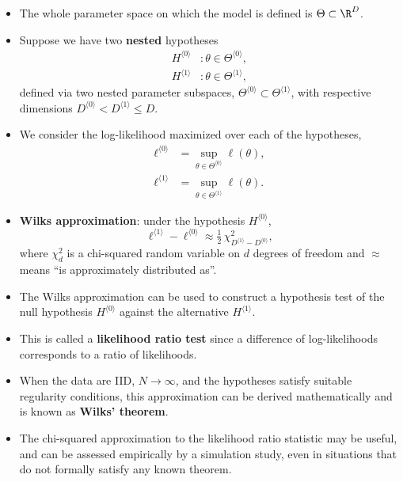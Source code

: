 \documentclass[
  letterpaper,
  DIV=11,
  numbers=noendperiod]{scrartcl}
\providecommand{\tightlist}{%
  \setlength{\itemsep}{0pt}\setlength{\parskip}{0pt}}\usepackage{longtable,booktabs,array}
\begin{document}
\begin{itemize}
\tightlist
\item
  The whole parameter space on which the model is defined is
  \(\Theta\subset\R^D\).
\item
  Suppose we have two \textbf{nested} hypotheses \begin{equation*}
    \begin{aligned}
      H^{\langle 0\rangle} &: \theta\in \Theta^{\langle 0\rangle}, \\
      H^{\langle 1\rangle} &: \theta\in \Theta^{\langle 1\rangle},
    \end{aligned}
  \end{equation*} defined via two nested parameter subspaces,
  \(\Theta^{\langle 0\rangle}\subset \Theta^{\langle 1\rangle}\), with
  respective dimensions
  \(D^{\langle 0\rangle}< D^{\langle 1\rangle}\le D\).
\item
  We consider the log-likelihood maximized over each of the hypotheses,
  \[
    \begin{aligned}
      \ell^{\langle 0\rangle} &= \sup_{\theta\in \Theta^{\langle 0\rangle}} \ell(\theta), \\
      \ell^{\langle 1\rangle} &= \sup_{\theta\in \Theta^{\langle 1\rangle}} \ell(\theta).
    \end{aligned}
  \]
\item
  \textbf{Wilks approximation}: under the hypothesis
  \(H^{\langle 0\rangle}\), \[
    \ell^{\langle 1\rangle} - \ell^{\langle 0\rangle} \approx \tfrac{1}{2}\,\chi^2_{D^{\langle 1\rangle}- D^{\langle 0\rangle}},
  \] where \(\chi^2_d\) is a chi-squared random variable on \(d\)
  degrees of freedom and \(\approx\) means ``is approximately
  distributed as''.
\item
  The Wilks approximation can be used to construct a hypothesis test of
  the null hypothesis \(H^{\langle 0\rangle}\) against the alternative
  \(H^{\langle 1\rangle}\).
\item
  This is called a \textbf{likelihood ratio test} since a difference of
  log-likelihoods corresponds to a ratio of likelihoods.
\item
  When the data are IID, \(N\to\infty\), and the hypotheses satisfy
  suitable regularity conditions, this approximation can be derived
  mathematically and is known as \textbf{Wilks' theorem}.
\item
  The chi-squared approximation to the likelihood ratio statistic may be
  useful, and can be assessed empirically by a simulation study, even in
  situations that do not formally satisfy any known theorem.
\end{itemize}
\end{document}
